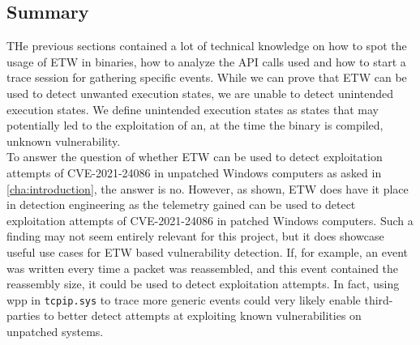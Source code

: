 \documentclass{report}
\begin{document}
\subsection{Summary}
THe previous sections contained a lot of technical knowledge on how to spot the usage of \gls{ETW} in binaries, how to analyze the API calls used and how to start a trace session for gathering specific events. While we can prove that \gls{ETW} can be used to detect unwanted execution states, we are unable to detect unintended execution states. We define unintended execution states as states that may potentially led to the exploitation of an, at the time the binary is compiled, unknown vulnerability.
\\
To answer the question of whether \gls{ETW} can be used to detect exploitation attempts of CVE-2021-24086 in unpatched Windows computers as asked in \ref{cha:introduction}, the answer is no. However, as shown, \gls{ETW} does have it place in detection engineering as the telemetry gained can be used to detect exploitation attempts of CVE-2021-24086 in patched Windows computers. Such a finding may not seem entirely relevant for this project, but it does showcase useful use cases for \gls{ETW} based vulnerability detection. If, for example, an event was written every time a packet was reassembled, and this event contained the reassembly size, it could be used to detect exploitation attempts. In fact, using \gls{wpp} in \texttt{tcpip.sys} to trace more generic events could very likely enable third-parties to better detect attempts at exploiting known vulnerabilities on unpatched systems.
\end{document}
